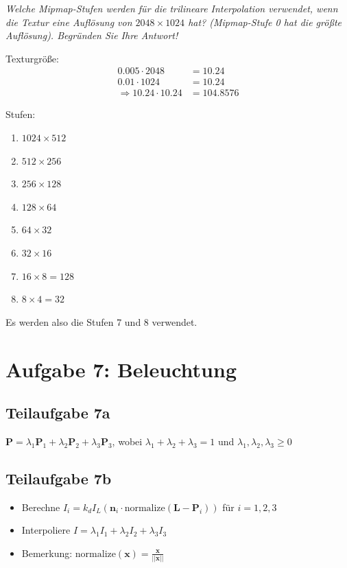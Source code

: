\documentclass[a4paper]{scrartcl}
\begin{document}
\textit{Welche Mipmap-Stufen werden für die trilineare Interpolation verwendet, wenn die
Textur eine Auflösung von $2048\times1024$ hat? (Mipmap-Stufe 0 hat die größte Auflösung).
Begründen Sie Ihre Antwort!}

Texturgröße:
\begin{align}
    0.005 \cdot 2048 &= 10.24\\
    0.01 \cdot 1024 &= 10.24\\
    \Rightarrow 10.24 \cdot 10.24 &= 104.8576
\end{align}

Stufen:
\begin{enumerate}
    \item $1024 \times 512$
    \item $512 \times 256$
    \item $256 \times 128$
    \item $128 \times 64$
    \item $64 \times 32$
    \item $32 \times 16$
    \item $16 \times 8 = 128$
    \item $8 \times 4 = 32$
\end{enumerate}

Es werden also die Stufen 7 und 8 verwendet.

\clearpage
\section*{Aufgabe 7: Beleuchtung}
\subsection*{Teilaufgabe 7a}
$\mathbf{P} = \lambda_1 \mathbf{P}_1 + \lambda_2 \mathbf{P}_2 + \lambda_3 \mathbf{P}_3$, wobei $\lambda_1 + \lambda_2 + \lambda_3 = 1$
und $\lambda_1, \lambda_2, \lambda_3 \geq 0$

\subsection*{Teilaufgabe 7b}
\begin{itemize}
    \item Berechne $I_i = k_d I_L (\mathbf{n}_i \cdot \text{normalize}(\mathbf{L}-\mathbf{P}_i))$ für $i = 1,2,3$
    \item Interpoliere $I = \lambda_1 I_1 + \lambda_2 I_2 + \lambda_3 I_3$
    \item Bemerkung: $\text{normalize}(\mathbf{x}) = \frac{\mathbf{x}}{||\mathbf{x}||}$
\end{itemize}
\end{document}
